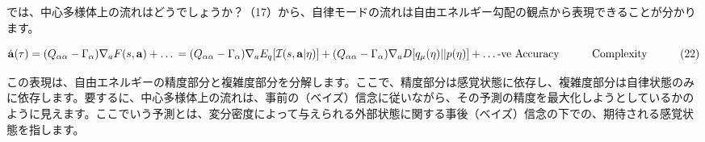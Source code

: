 \documentclass[a4paper, titlepage]{jsarticle}
\begin{document}
では、中心多様体上の流れはどうでしょうか？（17）から、自律モードの流れは自由エネルギー勾配の観点から表現できることが分かります。

$$
\dot{\mathbf{a}}(\tau) = (Q_{\alpha\alpha} - \Gamma_{\alpha}) \nabla_a F(s, \mathbf{a}) + \dots \\
= (Q_{\alpha\alpha} - \Gamma_{\alpha}) \nabla_a E_q[\mathcal{I}(s, \mathbf{a} | \eta)] + (Q_{\alpha\alpha} - \Gamma_{\alpha}) \nabla_a D[q_{\mu}(\eta) || p(\eta)] + \dots \\
\text{-ve Accuracy} \quad \quad \quad \text{Complexity} \quad \quad \quad (22)
$$

この表現は、自由エネルギーの精度部分と複雑度部分を分解します。ここで、精度部分は感覚状態に依存し、複雑度部分は自律状態のみに依存します。要するに、中心多様体上の流れは、事前の（ベイズ）信念に従いながら、その予測の精度を最大化しようとしているかのように見えます。ここでいう予測とは、変分密度によって与えられる外部状態に関する事後（ベイズ）信念の下での、期待される感覚状態を指します。
\end{document}
